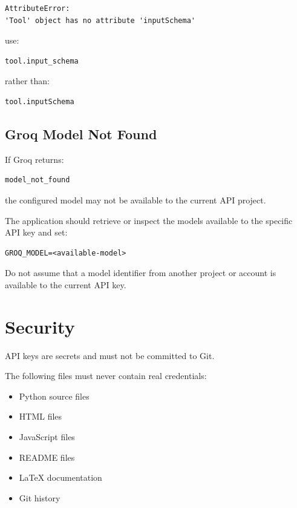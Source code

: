 \documentclass[11pt,a4paper]{article}
\begin{document}
\begin{lstlisting}[style=terminal]
AttributeError:
'Tool' object has no attribute 'inputSchema'
\end{lstlisting}

use:

\begin{lstlisting}[style=python,language=Python]
tool.input_schema
\end{lstlisting}

rather than:

\begin{lstlisting}[style=python,language=Python]
tool.inputSchema
\end{lstlisting}

\subsection{Groq Model Not Found}

If Groq returns:

\begin{lstlisting}[style=terminal]
model_not_found
\end{lstlisting}

the configured model may not be available to the current API project.

The application should retrieve or inspect the models available to the
specific API key and set:

\begin{lstlisting}[style=env]
GROQ_MODEL=<available-model>
\end{lstlisting}

Do not assume that a model identifier from another project or account
is available to the current API key.

\section{Security}

API keys are secrets and must not be committed to Git.

The following files must never contain real credentials:

\begin{itemize}
\item Python source files
\item HTML files
\item JavaScript files
\item README files
\item LaTeX documentation
\item Git history
\end{itemize}
\end{document}
